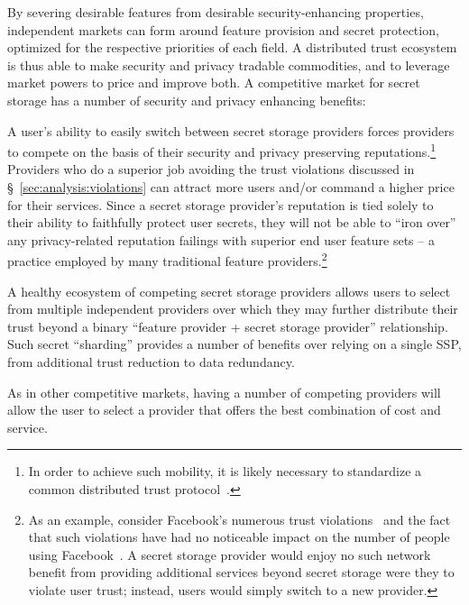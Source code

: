 By severing desirable features from desirable security-enhancing
properties, independent markets can form around feature provision and
secret protection, optimized for the respective priorities of each
field. A distributed trust ecosystem is thus able to make security and
privacy tradable commodities, and to leverage market powers to price
and improve both. A competitive market for secret storage has a number
of security and privacy enhancing benefits:

\begin{packed_desc}
\item[Reputation:] A user's ability to easily switch between secret
  storage providers forces providers to compete on the basis of their
  security and privacy preserving reputations.\footnote{In order to
    achieve such mobility, it is likely necessary to standardize a
    common distributed trust protocol~\cite{sayler-phd}.} Providers
  who do a superior job avoiding the trust violations discussed in
  \S~\ref{sec:analysis:violations} can attract more users and/or
  command a higher price for their services. Since a secret storage
  provider's reputation is tied solely to their ability to faithfully
  protect user secrets, they will not be able to ``iron over'' any
  privacy-related reputation failings with superior end user feature
  sets -- a practice employed by many traditional feature
  providers.\footnote{As an example, consider Facebook's numerous
    trust violations~\cite{goel2014, lomas2014, tsukayama2014} and the
    fact that such violations have had no noticeable impact on the
    number of people using Facebook~\cite{foster2014}. A secret
    storage provider would enjoy no such network benefit from
    providing additional services beyond secret storage were they to
    violate user trust; instead, users would simply switch to a new
    provider.}
\item[Multiple Providers:] A healthy ecosystem of competing secret
  storage providers allows users to select from multiple independent
  providers over which they may further distribute their trust beyond
  a binary ``feature provider + secret storage provider''
  relationship. Such secret ``sharding'' provides a number of benefits
  over relying on a single SSP, from additional trust reduction to
  data redundancy.
\item[Cost:] As in other competitive markets, having a number of
  competing providers will allow the user to select a provider that
  offers the best combination of cost and service.
\end{packed_desc}

